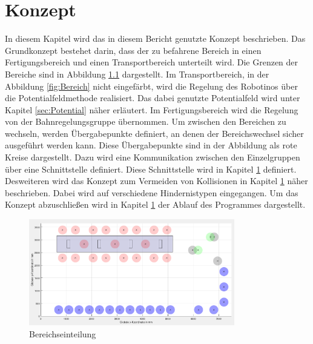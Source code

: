 \chapter{Konzept}
In diesem Kapitel wird das in diesem Bericht genutzte Konzept beschrieben. Das Grundkonzept bestehet darin, dass der zu befahrene Bereich in einen Fertigungsbereich und einen Transportbereich unterteilt wird. Die Grenzen der Bereiche sind in Abbildung \ref{fig:Bereiche} dargestellt. Im Transportbereich, in der Abbildung \ref{fig:Bereich} nicht eingefärbt, wird die Regelung des Robotinos über die Potentialfeldmethode realisiert. Das dabei genutzte Potentialfeld wird unter Kapitel \ref{sec:Potential} näher erläutert. Im Fertigungsbereich wird die Regelung von der Bahnregelungsgruppe übernommen. Um zwischen den Bereichen zu wechseln, werden Übergabepunkte definiert, an denen der Bereichswechsel sicher ausgeführt werden kann. Diese Übergabepunkte sind in der Abbildung als rote Kreise dargestellt. Dazu wird eine Kommunikation zwischen den Einzelgruppen über eine Schnittstelle definiert. Diese Schnittstelle wird in Kapitel \ref{} definiert. Desweiteren wird das Konzept zum Vermeiden von Kollisionen in Kapitel \ref{} näher beschrieben. Dabei wird auf verschiedene Hindernistypen eingegangen. Um das Konzept abzuschließen wird in Kapitel \ref{} der Ablauf des Programmes dargestellt.

\begin{figure}[!h]
	\centering	\includegraphics[width=0.8\textwidth]{grafiken/TransportbereichKarte.png}
	\caption{Bereichseinteilung}
	\label{fig:Bereiche}
\end{figure}
